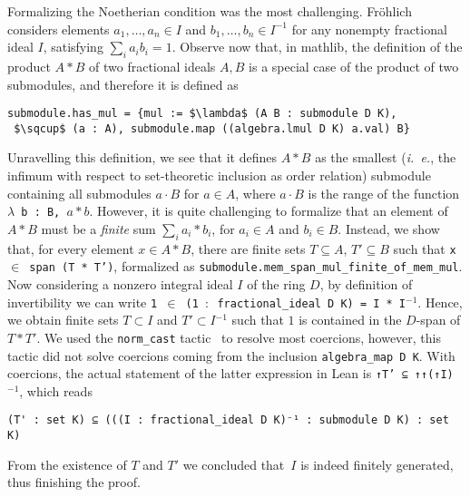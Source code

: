 \documentclass[sn-mathphys]{sn-jnl}%
\newcommand{\inv}{\ensuremath{{}^{-1}}}
\newcommand{\lean}[1]{\texttt{#1}\xspace}
\newcommand{\mathlib}{\textsf{mathlib}\xspace}
\begin{document}
Formalizing the Noetherian condition was the most challenging. Fr\"ohlich considers elements $a_1, \dots, a_n \in I$ and $b_1, \dots, b_n \in I^{-1}$ for any nonempty fractional ideal $I$,
satisfying $ \sum_i a_i b_i = 1 $. Observe now that, in \mathlib, the definition of the product $A\ast B$ of two fractional ideals $A,B$ is a special case of the product of two submodules, and therefore it is defined as
\begin{lstlisting}
submodule.has_mul = {mul := $\lambda$ (A B : submodule D K),
 $\sqcup$ (a : A), submodule.map ((algebra.lmul D K) a.val) B}
\end{lstlisting}
Unravelling this definition, we see that it defines $A\ast B$ as the smallest (\emph{i.~e.}, the infimum with respect to set-theoretic inclusion as order relation) submodule containing all submodules $a\cdot B$ for $a\in A$, where $a \cdot B$ is the range of the function \lean{$\lambda$ b : B, $a\ast b$}. However, it is quite challenging to formalize that an element of $A\ast B$ must be a \emph{finite} sum $\sum_{i} a_i*b_i$, for $a_i \in A$ and $b_i \in B$. Instead, we show that, for every element $x\in A\ast B$, there are finite sets $T\subseteq A$, $T'\subseteq B$ such that \lean{x $\in$ span (T * T')}, formalized as
\lean{submodule.mem\_span\_mul\_finite\-\_of\-\_mem\-\_mul}.
Now considering a nonzero integral ideal $I$ of the ring $D$, by definition of invertibility we can write \lean{1 $\in$ (1 $:$ fractional\_ideal D K) = I * I\inv}. Hence, we obtain 
finite sets $T \subset I$ and $T' \subset I\inv$ such that $1$ is contained in the $D$-span of $T*T'$. We used the \lean{norm\_cast} tactic~\cite{norm_cast} to resolve most coercions, however, this tactic did not solve coercions coming from the inclusion \lean{algebra\_map D K}. With coercions, the actual statement of the latter expression in Lean is \lean{↑T' ⊆ ↑↑(↑I)\inv}, which reads
\begin{lstlisting}
(T' : set K) ⊆ (((I : fractional_ideal D K)⁻¹ : submodule D K) : set K)
\end{lstlisting}
From the existence of $T$ and $T'$ we concluded that~$I$ is indeed finitely generated, thus finishing the proof.
\end{document}
